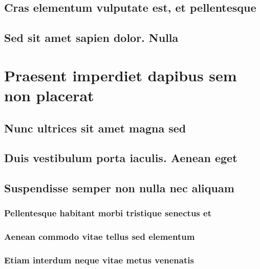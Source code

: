 \documentclass[%
  english,%
]{doctorate}
\begin{document}
\lipsum[1-8]

\subsection{Cras elementum vulputate est, et pellentesque}

\lipsum[1-8]

\subsection{Sed sit amet sapien dolor. Nulla}

\lipsum[1-8]

\section{Praesent imperdiet dapibus sem non placerat}

\lipsum[1-8]

\subsection{Nunc ultrices sit amet magna sed}

\lipsum[1-8]

\subsection{Duis vestibulum porta iaculis. Aenean eget}

\lipsum[1-8]

\subsection{Suspendisse semper non nulla nec aliquam}

\lipsum[1-8]

\subsubsection{Pellentesque habitant morbi tristique senectus et}

\lipsum[1-8]

\subsubsection{Aenean commodo vitae tellus sed elementum}

\lipsum[1-8]

\subsubsection{Etiam interdum neque vitae metus venenatis}
\end{document}
